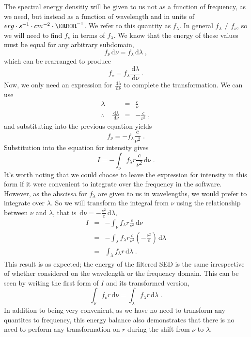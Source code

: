 \documentclass[12pt]{scrartcl}
\newcommand{\dx}[1]{\ensuremath{\,\mathrm{d}#1}}
\begin{document}
The spectral energy densitiy will be given
to us not as a function of frequency, as we need, but instead as
a function of wavelength and in units of
$erg\cdot s^{-1}\cdot cm^{-2}\cdot \angstrom^{-1}$. We refer to this quantity as
$f_\lambda$. In general $f_\lambda \ne f_\nu$, so we
will need to find $f_\nu$ in terms of $f_\lambda$.
We know that the energy of these values
must be equal for any arbitrary subdomain,
\[ f_\nu \dx{\nu} = f_\lambda \dx{\lambda} \; , \]
which can be rearranged to produce
\[ f_\nu = f_\lambda \frac{\dx{\lambda}}{\dx{\nu}} \; . \]
Now, we only need an expression for $\frac{\dx{\lambda}}{\dx{\nu}}$
to complete the transformation. We can use
\begin{eqnarray*}
\lambda & = & \frac{c}{\nu} \\
\therefore \;\;\;\; \frac{\dx{\lambda}}{\dx{\nu}} & = & -\frac{c}{\nu^2} \; ,
\end{eqnarray*}
and substituting into the previous equation yields
\[ f_\nu = -f_\lambda \frac{c}{\nu^2} \; . \]
Substitution into the equation for intensity gives
\[ I = -\int_\nu f_\lambda r \frac{c}{\nu^2} \dx{\nu} \; . \]
It's worth noting that we could choose to leave the expression
for intensity in this form if it were convenient to integrate
over the frequency in the software. However, as the abscissa for
$f_\lambda$ are given to us in wavelengths, we would prefer to
integrate over $\lambda$. So
we will transform the integral from $\nu$ using the relationship
between $\nu$ and $\lambda$, that is $\dx{\nu} = -\frac{\nu^2}{c}\dx{\lambda}$,
\begin{eqnarray*}
I & = & -\int_\nu f_\lambda r \frac{c}{\nu^2} \dx{\nu} \\
& = & -\int_\lambda f_\lambda r \frac{c}{\nu^2} \left(-\frac{\nu^2}{c}\right) \dx{\lambda} \\
& = & \int_\lambda f_\lambda r \dx{\lambda} \; .
\end{eqnarray*}
This result is as expected; the energy of the filtered SED is the same
irrespective of whether considered on the wavelength or the
frequency domain. This can be seen by writing the first form of
$I$ and its transformed version,
\[ \int_\nu f_\nu r \dx{\nu} = \int_\lambda f_\lambda r \dx{\lambda} \; . \]
In addition to being very convenient, as we have no need
to transform any quantites to frequency, this energy balance also
demonstrates that there is no need to perform any transformation on
$r$ during the shift from $\nu$ to $\lambda$.
\end{document}
